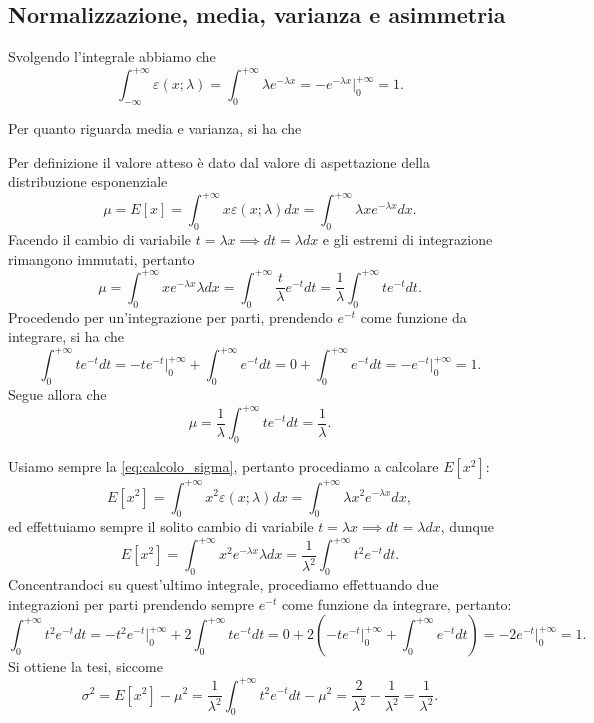 \documentclass{report}
\begin{document}
\subsection{Normalizzazione, media, varianza e asimmetria}
\begin{myproof}
	Svolgendo l'integrale abbiamo che
	$$
	\int_{-\infty}^{+\infty} \varepsilon(x; \lambda) = \int_0^{+\infty} \lambda e^{-\lambda x} = - e^{-\lambda x}\bigg|^{+\infty}_{0} = 1.
	$$
\end{myproof}
Per quanto riguarda media e varianza, si ha che
\begin{myproof}
	Per definizione il valore atteso è dato dal valore di aspettazione della distribuzione esponenziale
	$$
	\mu = E[x] = \int_0^{+\infty} x \varepsilon(x; \lambda)dx = \int_0^{+\infty} \lambda x e^{-\lambda x}dx.  
	$$
	Facendo il cambio di variabile $t = \lambda x \implies dt = \lambda dx$ e gli estremi di integrazione rimangono immutati, pertanto
	$$
	\mu = \int_0^{+\infty} x e^{-\lambda x} \lambda dx = \int_0^{+\infty} \frac{t}{\lambda} e^{-t} dt = \frac{1}{\lambda} \int_0^{+\infty} te^{-t}dt. 
	$$
	Procedendo per un'integrazione per parti, prendendo $e^{-t}$ come funzione da integrare, si ha che
	$$
		\int_0^{+\infty} te^{-t} dt = -te^{-t}\bigg|^{+\infty}_0 + \int_0^{+\infty} e^{-t}dt = 0 + \int_0^{+\infty} e^{-t}dt = -e^{-t}\bigg|^{+\infty}_0 = 1. 
	$$
	Segue allora che
	$$
		\mu = \frac{1}{\lambda} \int_0^{+\infty} te^{-t}dt = \frac{1}{\lambda}.
	$$
\end{myproof}
\begin{myproof}
	Usiamo sempre la \ref{eq:calcolo_sigma}, pertanto procediamo a calcolare $E[x^2]$:
	$$
		E[x^2] = \int_0^{+\infty} x^2 \varepsilon(x; \lambda)dx = \int_0^{+\infty} \lambda x^2 e^{-\lambda x}dx,
	$$
	ed effettuiamo sempre il solito cambio di variabile $t = \lambda x \implies dt = \lambda dx$, dunque
	$$
		E[x^2] = \int_0^{+\infty} x^2 e^{-\lambda x} \lambda dx = \frac{1}{\lambda^2} \int_0^{+\infty} t^2 e^{-t} dt.
	$$
	Concentrandoci su quest'ultimo integrale, procediamo effettuando due integrazioni per parti prendendo sempre $e^{-t}$ come funzione da integrare, pertanto:
	$$
	\int_0^{+\infty} t^2 e^{-t}dt = -t^2 e^{-t}\bigg|^{+\infty}_0 + 2\int^{+\infty}_0 te^{-t}dt = 0 + 2(-te^{-t}\bigg|^{+\infty}_0 + \int_0^{+\infty} e^{-t}dt) = - 2e^{-t}\bigg|^{+\infty}_0 = 1.
	$$
	Si ottiene la tesi, siccome
	$$
	\sigma^2 = E[x^2] - \mu^2 = \frac{1}{\lambda^2} \int_0^{+\infty} t^2 e^{-t}dt - \mu^2 = \frac{2}{\lambda^2} - \frac{1}{\lambda^2} = \frac{1}{\lambda^2}.
	$$
\end{myproof}
\end{document}
